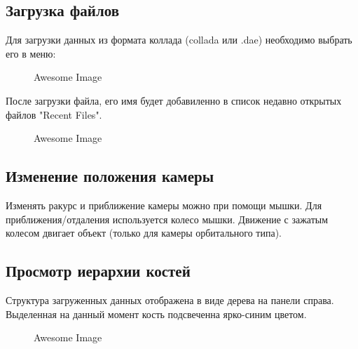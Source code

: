 \subsection{Загрузка файлов}
Для загрузки данных из формата коллада (collada или .dae) необходимо выбрать его в меню:

\begin{figure}[h!]
    \centering
    \caption{Awesome Image}
    \label{fig:awesome_image}
\end{figure}

После загрузки файла, его имя будет добавиленно в список недавно открытых файлов "Recent Files".

\begin{figure}[h!]
    \centering
    \caption{Awesome Image}
    \label{fig:awesome_image}
\end{figure}


\subsection{Изменение положения камеры}
Изменять ракурс и приближение камеры можно при помощи мышки. Для приближения/отдаления используется колесо мышки. Движение с зажатым колесом двигает объект (только для камеры орбитального типа).


\subsection{Просмотр иерархии костей}
Структура загруженных данных отображена в виде дерева на панели справа. Выделенная на данный момент кость подсвеченна ярко-синим цветом.

\begin{figure}[h!]
    \centering
    \caption{Awesome Image}
    \label{fig:awesome_image}
\end{figure}



